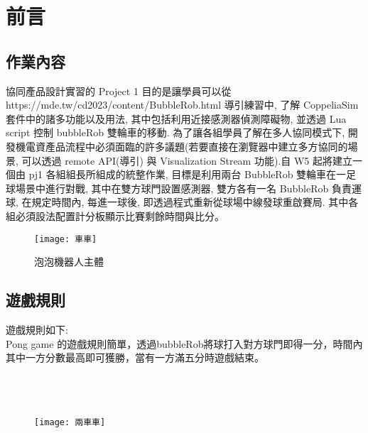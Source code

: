 \chapter{前言}
\renewcommand{\baselinestretch}{10.0} %
\setcounter{page}{1}  %
\fontsize{14pt}{2.5pt}\sectionef
\section{作業內容}
協同產品設計實習的 Project 1 目的是讓學員可以從 \\
https://mde.tw/cd2023/content/BubbleRob.html 導引練習中, 了解 CoppeliaSim 套件中的諸多功能以及用法, 其中包括利用近接感測器偵測障礙物, 並透過 Lua script 控制 bubbleRob 雙輪車的移動. 為了讓各組學員了解在多人協同模式下, 開發機電資產品流程中必須面臨的許多議題(若要直接在瀏覽器中建立多方協同的場景, 可以透過 remote API(導引) 與 Visualization Stream 功能).自 W5 起將建立一個由 pj1 各組組長所組成的統整作業, 目標是利用兩台 BubbleRob 雙輪車在一足球場景中進行對戰, 其中在雙方球門設置感測器, 雙方各有一名 BubbleRob 負責運球, 在規定時間內, 每進一球後, 即透過程式重新從球場中線發球重啟賽局. 其中各組必須設法配置計分板顯示比賽剩餘時間與比分。\\

\begin{figure}[hbt!]
\begin{center}
\texttt{[image: 車車]}
\caption{\Large 泡泡機器人主體 }
\label{泡泡機器人主體}
\end{center}
\end{figure}


\section{遊戲規則}
遊戲規則如下:\\

Pong game 的遊戲規則簡單，透過bubbleRob將球打入對方球門即得一分，時間內其中一方分數最高即可獲勝，當有一方滿五分時遊戲結束。
\\
\\
\\
\\
   
\begin{figure}[hbt!]
\begin{center}
\texttt{[image: 兩車車]}
\caption{ }
\label{主體和場地 }
\end{center}
\end{figure}
\newpage


